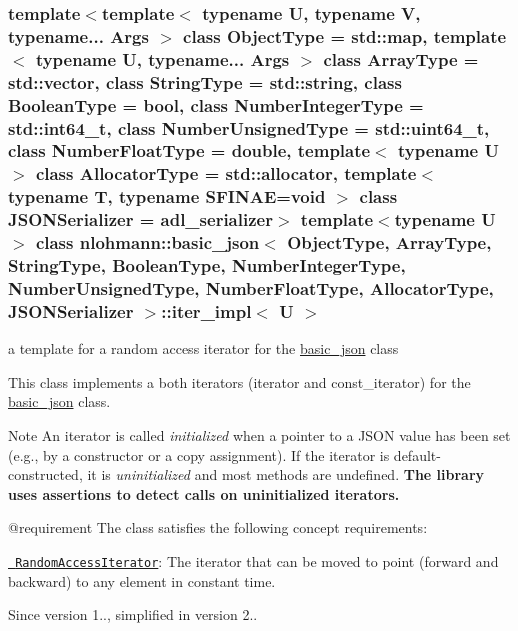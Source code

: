 \subsubsection*{template$<$template$<$ typename U, typename V, typename... Args $>$ class Object\+Type = std\+::map, template$<$ typename U, typename... Args $>$ class Array\+Type = std\+::vector, class String\+Type = std\+::string, class Boolean\+Type = bool, class Number\+Integer\+Type = std\+::int64\+\_\+t, class Number\+Unsigned\+Type = std\+::uint64\+\_\+t, class Number\+Float\+Type = double, template$<$ typename U $>$ class Allocator\+Type = std\+::allocator, template$<$ typename T, typename S\+F\+I\+N\+A\+E=void $>$ class J\+S\+O\+N\+Serializer = adl\+\_\+serializer$>$\newline
template$<$typename U$>$\newline
class nlohmann\+::basic\+\_\+json$<$ Object\+Type, Array\+Type, String\+Type, Boolean\+Type, Number\+Integer\+Type, Number\+Unsigned\+Type, Number\+Float\+Type, Allocator\+Type, J\+S\+O\+N\+Serializer $>$\+::iter\+\_\+impl$<$ U $>$}

a template for a random access iterator for the \mbox{\hyperlink{classnlohmann_1_1basic__json}{basic\+\_\+json}} class 

This class implements a both iterators (iterator and const\+\_\+iterator) for the \mbox{\hyperlink{classnlohmann_1_1basic__json}{basic\+\_\+json}} class.

\begin{DoxyNote}{Note}
An iterator is called {\itshape initialized} when a pointer to a J\+S\+ON value has been set (e.\+g., by a constructor or a copy assignment). If the iterator is default-\/constructed, it is {\itshape uninitialized} and most methods are undefined. {\bfseries{The library uses assertions to detect calls on uninitialized iterators.}}
\end{DoxyNote}
@requirement The class satisfies the following concept requirements\+:
\begin{DoxyItemize}
\item \href{http://en.cppreference.com/w/cpp/concept/RandomAccessIterator}{\texttt{ Random\+Access\+Iterator}}\+: The iterator that can be moved to point (forward and backward) to any element in constant time.
\end{DoxyItemize}

\begin{DoxySince}{Since}
version 1.., simplified in version 2.. 
\end{DoxySince}



